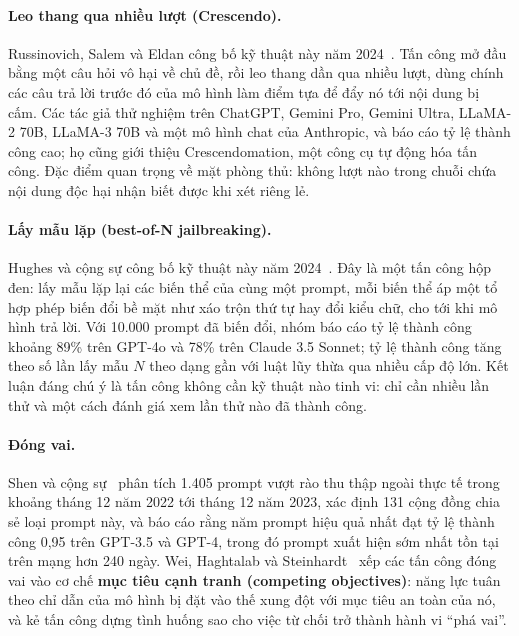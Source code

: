 \paragraph{Leo thang qua nhiều lượt (Crescendo).} Russinovich, Salem và Eldan công bố kỹ thuật này năm 2024~\cite{russinovich2024crescendo}. Tấn công mở đầu bằng một câu hỏi vô hại về chủ đề, rồi leo thang dần qua nhiều lượt, dùng chính các câu trả lời trước đó của mô hình làm điểm tựa để đẩy nó tới nội dung bị cấm. Các tác giả thử nghiệm trên ChatGPT, Gemini Pro, Gemini Ultra, LLaMA-2 70B, LLaMA-3 70B và một mô hình chat của Anthropic, và báo cáo tỷ lệ thành công cao; họ cũng giới thiệu Crescendomation, một công cụ tự động hóa tấn công. Đặc điểm quan trọng về mặt phòng thủ: không lượt nào trong chuỗi chứa nội dung độc hại nhận biết được khi xét riêng lẻ.

\paragraph{Lấy mẫu lặp (best-of-N jailbreaking).} Hughes và cộng sự công bố kỹ thuật này năm 2024~\cite{hughes2024bon}. Đây là một tấn công hộp đen: lấy mẫu lặp lại các biến thể của cùng một prompt, mỗi biến thể áp một tổ hợp phép biến đổi bề mặt như xáo trộn thứ tự hay đổi kiểu chữ, cho tới khi mô hình trả lời. Với 10.000 prompt đã biến đổi, nhóm báo cáo tỷ lệ thành công khoảng 89\% trên GPT-4o và 78\% trên Claude 3.5 Sonnet; tỷ lệ thành công tăng theo số lần lấy mẫu $N$ theo dạng gần với luật lũy thừa qua nhiều cấp độ lớn. Kết luận đáng chú ý là tấn công không cần kỹ thuật nào tinh vi: chỉ cần nhiều lần thử và một cách đánh giá xem lần thử nào đã thành công.

\paragraph{Đóng vai.} Shen và cộng sự~\cite{shen2023dan} phân tích 1.405 prompt vượt rào thu thập ngoài thực tế trong khoảng tháng 12 năm 2022 tới tháng 12 năm 2023, xác định 131 cộng đồng chia sẻ loại prompt này, và báo cáo rằng năm prompt hiệu quả nhất đạt tỷ lệ thành công 0,95 trên GPT-3.5 và GPT-4, trong đó prompt xuất hiện sớm nhất tồn tại trên mạng hơn 240 ngày. Wei, Haghtalab và Steinhardt~\cite{wei2023jailbroken} xếp các tấn công đóng vai vào cơ chế \textbf{mục tiêu cạnh tranh (competing objectives)}: năng lực tuân theo chỉ dẫn của mô hình bị đặt vào thế xung đột với mục tiêu an toàn của nó, và kẻ tấn công dựng tình huống sao cho việc từ chối trở thành hành vi ``phá vai''.

